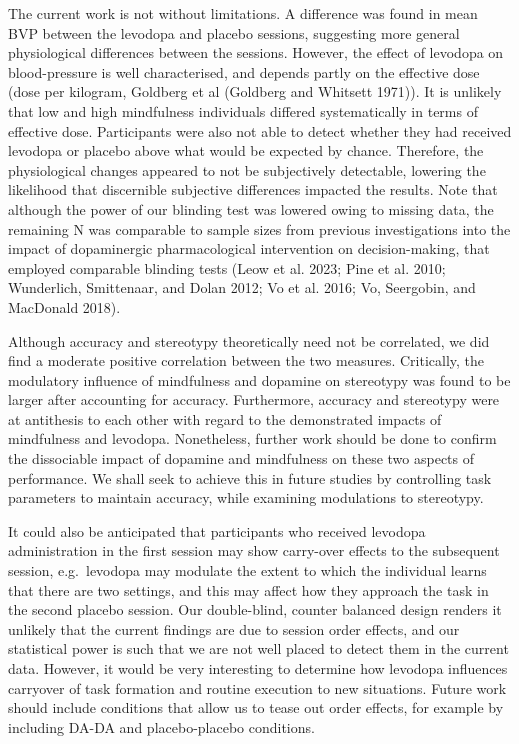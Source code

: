 \documentclass{article}
\begin{document}
The current work is not without limitations. A difference was found in
mean BVP between the levodopa and placebo sessions, suggesting more
general physiological differences between the sessions. However, the
effect of levodopa on blood-pressure is well characterised, and depends
partly on the effective dose (dose per kilogram, Goldberg et al
(Goldberg and Whitsett 1971)). It is unlikely that low and high
mindfulness individuals differed systematically in terms of effective
dose. Participants were also not able to detect whether they had
received levodopa or placebo above what would be expected by chance.
Therefore, the physiological changes appeared to not be subjectively
detectable, lowering the likelihood that discernible subjective
differences impacted the results. Note that although the power of our
blinding test was lowered owing to missing data, the remaining N was
comparable to sample sizes from previous investigations into the impact
of dopaminergic pharmacological intervention on decision-making, that
employed comparable blinding tests (Leow et al. 2023; Pine et al. 2010;
Wunderlich, Smittenaar, and Dolan 2012; Vo et al. 2016; Vo, Seergobin,
and MacDonald 2018).

Although accuracy and stereotypy theoretically need not be correlated,
we did find a moderate positive correlation between the two measures.
Critically, the modulatory influence of mindfulness and dopamine on
stereotypy was found to be larger after accounting for accuracy.
Furthermore, accuracy and stereotypy were at antithesis to each other
with regard to the demonstrated impacts of mindfulness and levodopa.
Nonetheless, further work should be done to confirm the dissociable
impact of dopamine and mindfulness on these two aspects of performance.
We shall seek to achieve this in future studies by controlling task
parameters to maintain accuracy, while examining modulations to
stereotypy.

It could also be anticipated that participants who received levodopa
administration in the first session may show carry-over effects to the
subsequent session, e.g.~levodopa may modulate the extent to which the
individual learns that there are two settings, and this may affect how
they approach the task in the second placebo session. Our double-blind,
counter balanced design renders it unlikely that the current findings
are due to session order effects, and our statistical power is such that
we are not well placed to detect them in the current data. However, it
would be very interesting to determine how levodopa influences carryover
of task formation and routine execution to new situations. Future work
should include conditions that allow us to tease out order effects, for
example by including DA-DA and placebo-placebo conditions.
\end{document}
